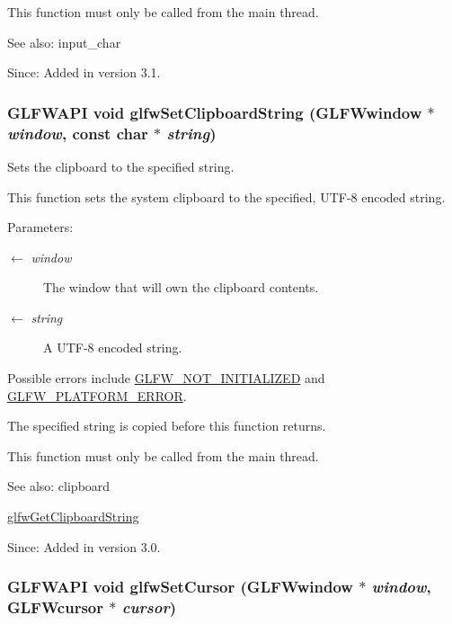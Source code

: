 This function must only be called from the main thread.

\begin{Desc}
\item[See also:]input\_\-char\end{Desc}
\begin{Desc}
\item[Since:]Added in version 3.1. \end{Desc}
\hypertarget{group__input_g7a580309bbc185a0459c3559021d2fd7}{
\subsubsection[glfwSetClipboardString]{\setlength{\rightskip}{0pt plus 5cm}GLFWAPI void glfwSetClipboardString ({\bf GLFWwindow} $\ast$ {\em window}, \/  const char $\ast$ {\em string})}}
\label{group__input_g7a580309bbc185a0459c3559021d2fd7}


Sets the clipboard to the specified string. 

This function sets the system clipboard to the specified, UTF-8 encoded string.

\begin{Desc}
\item[Parameters:]
\begin{description}
\item[\mbox{$\leftarrow$} {\em window}]The window that will own the clipboard contents. \item[\mbox{$\leftarrow$} {\em string}]A UTF-8 encoded string.\end{description}
\end{Desc}
Possible errors include \hyperlink{group__errors_g2374ee02c177f12e1fa76ff3ed15e14a}{GLFW\_\-NOT\_\-INITIALIZED} and \hyperlink{group__errors_gd44162d78100ea5e87cdd38426b8c7a1}{GLFW\_\-PLATFORM\_\-ERROR}.

The specified string is copied before this function returns.

This function must only be called from the main thread.

\begin{Desc}
\item[See also:]clipboard 

\hyperlink{group__input_g3ac90c8bbaf0b46063bb02b574f3b6f7}{glfwGetClipboardString}\end{Desc}
\begin{Desc}
\item[Since:]Added in version 3.0. \end{Desc}
\hypertarget{group__input_gfaf103cea2f43530cff7de4e01126a4f}{
\subsubsection[glfwSetCursor]{\setlength{\rightskip}{0pt plus 5cm}GLFWAPI void glfwSetCursor ({\bf GLFWwindow} $\ast$ {\em window}, \/  {\bf GLFWcursor} $\ast$ {\em cursor})}}
\label{group__input_gfaf103cea2f43530cff7de4e01126a4f}


